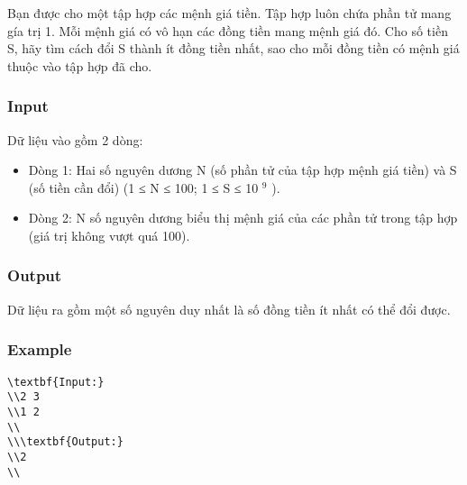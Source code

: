 



   Bạn được cho một tập hợp các mệnh giá tiền. Tập hợp luôn chứa phần tử mang gía trị 1. Mỗi mệnh giá có vô hạn các đồng tiền mang mệnh giá đó. Cho số tiền S, hãy tìm cách đổi S thành ít đồng tiền nhất, sao cho mỗi đồng tiền có mệnh giá thuộc vào tập hợp đã cho.  

\subsubsection{   Input  }

   Dữ liệu vào gồm 2 dòng:  
\begin{itemize}
	\item     Dòng 1: Hai số nguyên dương N (số phần tử của tập hợp mệnh giá tiền) và S (số tiền cần đổi) (1 ≤ N ≤ 100; 1 ≤ S ≤ 10    $^     9    $    ).   
	\item     Dòng 2: N số nguyên dương biểu thị mệnh giá của các phần tử trong tập hợp (giá trị không vượt quá 100).   
\end{itemize}

\subsubsection{   Output  }

   Dữ liệu ra gồm một số nguyên duy nhất là số đồng tiền ít nhất có thể đổi được.  

\subsubsection{   Example  }
\begin{verbatim}
\textbf{Input:}
\\2 3
\\1 2
\\
\\\textbf{Output:}
\\2
\\\end{verbatim}